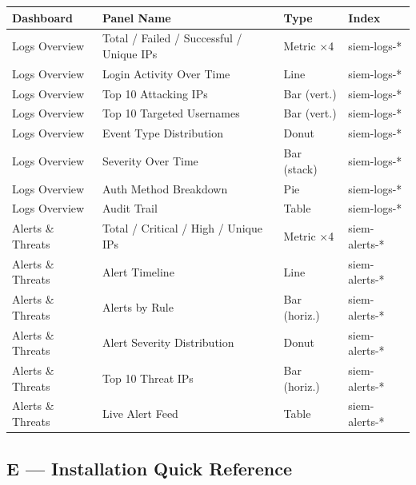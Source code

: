 \documentclass[12pt,a4paper]{article}
\begin{document}
\begin{center}
\small
\begin{tabular}{p{3cm}p{4cm}p{2.5cm}p{3.5cm}}
  \toprule
  \textbf{Dashboard} & \textbf{Panel Name} & \textbf{Type} & \textbf{Index} \\
  \midrule
  Logs Overview & Total / Failed / Successful / Unique IPs & Metric ×4 & siem-logs-* \\
  Logs Overview & Login Activity Over Time & Line & siem-logs-* \\
  Logs Overview & Top 10 Attacking IPs & Bar (vert.) & siem-logs-* \\
  Logs Overview & Top 10 Targeted Usernames & Bar (vert.) & siem-logs-* \\
  Logs Overview & Event Type Distribution & Donut & siem-logs-* \\
  Logs Overview & Severity Over Time & Bar (stack) & siem-logs-* \\
  Logs Overview & Auth Method Breakdown & Pie & siem-logs-* \\
  Logs Overview & Audit Trail & Table & siem-logs-* \\
  Alerts \& Threats & Total / Critical / High / Unique IPs & Metric ×4 & siem-alerts-* \\
  Alerts \& Threats & Alert Timeline & Line & siem-alerts-* \\
  Alerts \& Threats & Alerts by Rule & Bar (horiz.) & siem-alerts-* \\
  Alerts \& Threats & Alert Severity Distribution & Donut & siem-alerts-* \\
  Alerts \& Threats & Top 10 Threat IPs & Bar (horiz.) & siem-alerts-* \\
  Alerts \& Threats & Live Alert Feed & Table & siem-alerts-* \\
  \bottomrule
\end{tabular}
\end{center}

\subsection{E — Installation Quick Reference}
\end{document}

